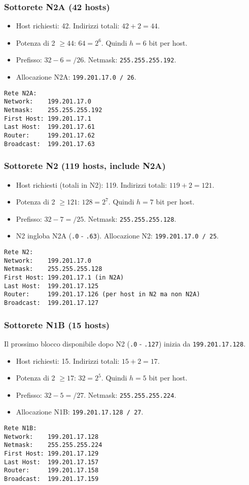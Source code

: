\subsubsection{Sottorete N2A (42 hosts)}
\begin{itemize}
    \item Host richiesti: 42. Indirizzi totali: $42 + 2 = 44$.
    \item Potenza di 2 $\geq 44$: $64 = 2^6$. Quindi $h=6$ bit per host.
    \item Prefisso: $32 - 6 = /26$. Netmask: \texttt{255.255.255.192}.
    \item Allocazione N2A: \texttt{199.201.17.0 / 26}.
\end{itemize}
\begin{verbatim}
Rete N2A:
Network:    199.201.17.0
Netmask:    255.255.255.192
First Host: 199.201.17.1
Last Host:  199.201.17.61
Router:     199.201.17.62
Broadcast:  199.201.17.63
\end{verbatim}

\subsubsection{Sottorete N2 (119 hosts, include N2A)}
\begin{itemize}
    \item Host richiesti (totali in N2): 119. Indirizzi totali: $119 + 2 = 121$.
    \item Potenza di 2 $\geq 121$: $128 = 2^7$. Quindi $h=7$ bit per host.
    \item Prefisso: $32 - 7 = /25$. Netmask: \texttt{255.255.255.128}.
    \item N2 ingloba N2A (\texttt{.0} - \texttt{.63}). Allocazione N2: \texttt{199.201.17.0 / 25}.
\end{itemize}
\begin{verbatim}
Rete N2:
Network:    199.201.17.0
Netmask:    255.255.255.128
First Host: 199.201.17.1 (in N2A)
Last Host:  199.201.17.125
Router:     199.201.17.126 (per host in N2 ma non N2A)
Broadcast:  199.201.17.127
\end{verbatim}

\subsubsection{Sottorete N1B (15 hosts)}
Il prossimo blocco disponibile dopo N2 (\texttt{.0} - \texttt{.127}) inizia da \texttt{199.201.17.128}.
\begin{itemize}
    \item Host richiesti: 15. Indirizzi totali: $15 + 2 = 17$.
    \item Potenza di 2 $\geq 17$: $32 = 2^5$. Quindi $h=5$ bit per host.
    \item Prefisso: $32 - 5 = /27$. Netmask: \texttt{255.255.255.224}.
    \item Allocazione N1B: \texttt{199.201.17.128 / 27}.
\end{itemize}
\begin{verbatim}
Rete N1B:
Network:    199.201.17.128
Netmask:    255.255.255.224
First Host: 199.201.17.129
Last Host:  199.201.17.157
Router:     199.201.17.158
Broadcast:  199.201.17.159
\end{verbatim}

